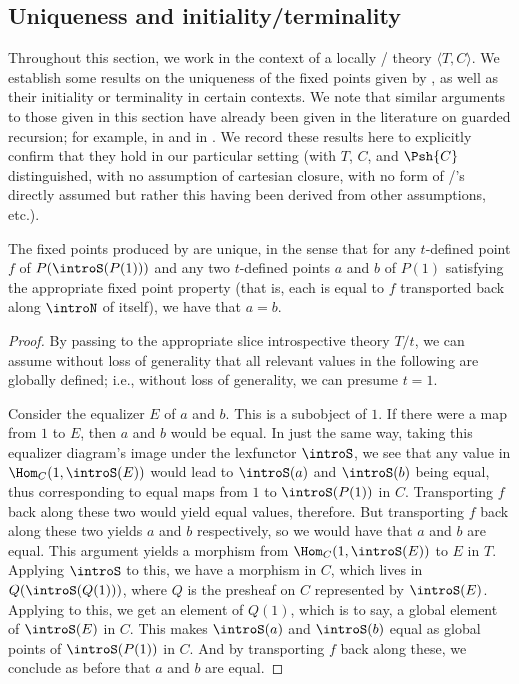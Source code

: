 \subsection{Uniqueness and initiality/terminality}
Throughout this section, we work in the context of a locally \Loeb/ theory $\langle T, C \rangle$. We establish some results on the uniqueness of the fixed points given by , as well as their initiality or terminality in certain contexts. We note that similar arguments to those given in this section have already been given in the literature on guarded recursion; for example, in \autocite{birkedal2011first} and in \autocite{birkedal2013universes}. We record these results here to explicitly confirm that they hold in our particular setting (with $T$, $C$, and $\Psh{C}$ distinguished, with no assumption of cartesian closure, with no form of \Loeb/'s directly assumed but rather this having been derived from other assumptions, etc.).


\begin{theorem}\label{UniqueFixedPoints}
The fixed points produced by  are unique, in the sense that for any $t$-defined point $f$ of $P(\introS(P(1)))$ and any two $t$-defined points $a$ and $b$ of $P(1)$ satisfying the appropriate fixed point property (that is, each is equal to $f$ transported back along $\introN$ of itself), we have that $a = b$.
\end{theorem}
\begin{proof}
By passing to the appropriate slice introspective theory $T/t$, we can assume without loss of generality that all relevant values in the following are globally defined; i.e., without loss of generality, we can presume $t = 1$.

Consider the equalizer $E$ of $a$ and $b$. This is a subobject of $1$. If there were a map from $1$ to $E$, then $a$ and $b$ would be equal. In just the same way, taking this equalizer diagram's image under the lexfunctor $\introS$, we see that any value in $\Hom_C(1, \introS(E))$ would lead to $\introS(a)$ and $\introS(b)$ being equal, thus corresponding to equal maps from $1$ to $\introS(P(1))$ in $C$. Transporting $f$ back along these two would yield equal values, therefore. But transporting $f$ back along these two yields $a$ and $b$ respectively, so we would have that $a$ and $b$ are equal. This argument yields a morphism from $\Hom_C(1, \introS(E))$ to $E$ in $T$. Applying $\introS$ to this, we have a morphism in $C$, which lives in $Q(\introS(Q(1)))$, where $Q$ is the presheaf on $C$ represented by $\introS(E)$. Applying  to this, we get an element of $Q(1)$, which is to say, a global element of $\introS(E)$ in $C$. This makes $\introS(a)$ and $\introS(b)$ equal as global points of $\introS(P(1))$ in $C$. And by transporting $f$ back along these, we conclude as before that $a$ and $b$ are equal. 
\end{proof}

